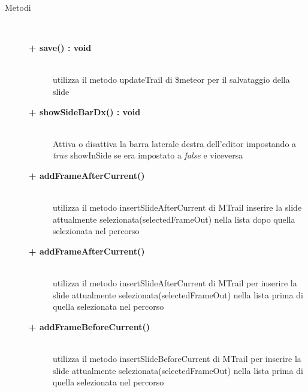 \begin{description}
	
\item[Metodi] \hfill \\

	\begin{description}
		\item[\textbf{\color{blue}+ save() : void			}] \hfill \\
			utilizza il metodo updateTrail di \$meteor per il salvataggio della slide
	\end{description}
	
	\begin{description}
		\item[\textbf{\color{blue}+ showSideBarDx() : void			}] \hfill \\
			Attiva o disattiva la barra laterale destra dell'editor impostando a \textit{true} showInSide se era impostato a \textit{false} e viceversa
	\end{description}
	
	\begin{description}
		\item[\textbf{\color{blue}+ addFrameAfterCurrent()			}] \hfill \\
			utilizza il metodo insertSlideAfterCurrent di MTrail inserire la slide attualmente selezionata(selectedFrameOut) nella lista dopo quella selezionata nel percorso
	\end{description}
	
	\begin{description}
		\item[\textbf{\color{blue}+ addFrameAfterCurrent()			}] \hfill \\
			utilizza il metodo insertSlideAfterCurrent di MTrail per inserire la slide attualmente selezionata(selectedFrameOut) nella lista prima di quella selezionata nel percorso
	\end{description}
	
	\begin{description}
		\item[\textbf{\color{blue}+ addFrameBeforeCurrent()			}] \hfill \\
			utilizza il metodo insertSlideBeforeCurrent di MTrail per inserire la slide attualmente selezionata(selectedFrameOut) nella lista prima di quella selezionata nel percorso
	\end{description}
	

\end{description}
